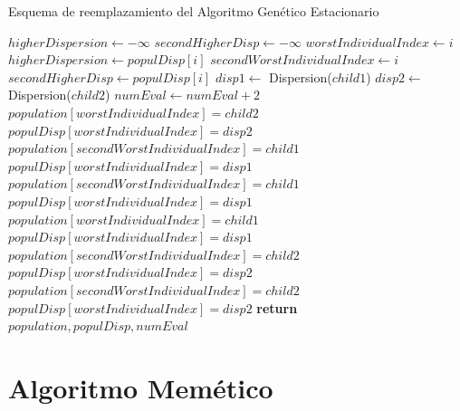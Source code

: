 \begin{algorithm}[H]
    \caption{Esquema de reemplazamiento del Algoritmo Genético Estacionario}
\begin{algorithmic}
    \State $higherDispersion \leftarrow -\infty$
    \State $secondHigherDisp \leftarrow -\infty$
    \State
            \State $worstIndividualIndex \leftarrow i$
            \State $higherDispersion \leftarrow populDisp[i]$
        \EndIf
    \EndFor
            \State $secondWorstIndividualIndex \leftarrow i$
            \State $secondHigherDisp \leftarrow populDisp[i]$
        \EndIf
    \EndFor
    \State
    \State $disp1 \leftarrow$ Dispersion($child1$)
    \State $disp2 \leftarrow$ Dispersion($child2$)
    \State $numEval \leftarrow numEval + 2$
            \State $population[worstIndividualIndex] = child2$
            \State $populDisp[worstIndividualIndex] = disp2$
            \State
            \State $population[secondWorstIndividualIndex] = child1$
            \State $populDisp[worstIndividualIndex] = disp1$
            \State
            \State $population[secondWorstIndividualIndex] = child1$
            \State $populDisp[worstIndividualIndex] = disp1$
        \EndIf
    \Else
            \State $population[worstIndividualIndex] = child1$
            \State $populDisp[worstIndividualIndex] = disp1$
            \State
            \State $population[secondWorstIndividualIndex] = child2$
            \State $populDisp[worstIndividualIndex] = disp2$
            \State
            \State $population[secondWorstIndividualIndex] = child2$
            \State $populDisp[worstIndividualIndex] = disp2$
        \EndIf
    \EndIf
    \State
    \State \textbf{return} $population, populDisp, numEval$
\EndProcedure
\end{algorithmic}
\end{algorithm}


\section{Algoritmo Memético}

